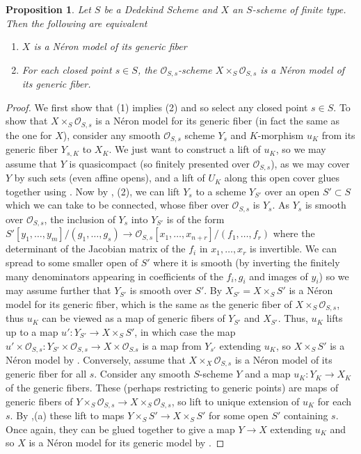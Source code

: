 \documentclass{article}
\theoremstyle{definition}
\theoremstyle{remark}
\theoremstyle{plain}
\newtheorem{proposition}[theorem]{Proposition}
\newcommand{\mc}[1]{\mathcal{#1}}
\begin{document}
\begin{proposition}\label{lg:closed}
	Let $S$ be a Dedekind Scheme and $X$ an $S$-scheme of finite type.
	Then the following are equivalent
	\begin{enumerate}
		\item $X$ is a N\'eron model of its generic fiber
		\item For each closed point $s \in S$, the $\mc{O}_{S,s}$-scheme $X \times_S \mc{O}_{S,s}$ is a N\'eron model of its generic fiber.
	\end{enumerate}
\end{proposition}

\begin{proof}
	We first show that (1) implies (2) and so select any closed point $s \in S$.
	To show that $X \times_S \mc{O}_{S,s}$ is a N\'eron model for its generic fiber (in fact the same as the one for $X$), consider any smooth $\mc{O}_{S,s}$ scheme $Y_s$ and $K$-morphism $u_K$ from its generic fiber $Y_{s,K}$ to $X_K$.
	We just want to construct a lift of $u_K$, so we may assume that $Y$ is quasicompact (so finitely presented over $\mc{O}_{S,s}$), as we may cover $Y$ by such sets (even affine opens), and a lift of $U_K$ along this open cover glues together using .
	Now by , (2), we can lift $Y_s$ to a scheme $Y_{S'}$ over an open $S' \subset S$ which we can take to be connected, whose fiber over $\mc{O}_{S,s}$ is $Y_s$.
	As $Y_s$ is smooth over $\mc{O}_{S,s}$, the inclusion of $Y_s$ into $Y_{S'}$ is of the form $S'[y_1, \dots, y_m]/(g_1, \dots, g_s) \to \mc{O}_{S,s}[x_1, \dots, x_{n+r}]/(f_1, \dots, f_r)$ where the determinant of the Jacobian matrix of the $f_i$ in $x_1, \dots, x_r$ is invertible. 
	We can spread to some smaller open of $S'$ where it is smooth (by inverting the finitely many denominators appearing in coefficients of the $f_i, g_i$ and images of $y_i$) so we may assume further that $Y_{S'}$ is smooth over $S'$.
	By  $X_{S'} = X \times_S S'$ is a N\'eron model for its generic fiber, which is the same as the generic fiber of $X \times_S \mc{O}_{S,s}$, thus $u_K$ can be viewed as a map of generic fibers of $Y_{S'}$ and $X_{S'}$.
	Thus, $u_K$ lifts up to a map $u': Y_{S'} \to X \times_S S'$, in which case the map $u' \times \mc{O}_{S,s}: Y_{S'} \times \mc{O}_{S,s} \to X \times \mc{O}_{S.s}$ is a map from $Y_{s'}$ extending $u_K$, so $X \times_S S'$ is a N\'eron model by .\newline
	\indent Conversely, assume that $X \times_X \mc{O}_{S,s}$ is a N\'eron model of its generic fiber for all $s$. 
	Consider any smooth $S$-scheme $Y$ and a map $u_K: Y_K \to X_K$ of the generic fibers. These (perhaps restricting to generic points) are maps of generic fibers of $Y \times_S \mc{O}_{S,s} \to X \times_S \mc{O}_{S,s}$, so lift to unique extension of $u_K$ for each $s$. By ,(a) these lift to maps $Y \times_S S' \to X \times_S S'$ for some open $S'$ containing $s$. Once again, they can be glued together to give a map $Y \to X$ extending $u_K$ and so $X$ is a N\'eron model for its generic model by .
\end{proof}
\end{document}
